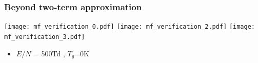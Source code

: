 \documentclass[mathserif, aspectratio=169]{beamer}
\begin{document}
\begin{frame}[fragile]
\begin{center}
	\end{center}
\end{frame}



\begin{frame}
	\frametitle{Beyond two-term approximation}
	\vspace{-0.25in}
	\begin{center}
		\texttt{[image: mf\_verification\_0.pdf]}
		\texttt{[image: mf\_verification\_2.pdf]}
		\texttt{[image: mf\_verification\_3.pdf]}
	\end{center}
	\begin{itemize}
		\item $E/N$ = 500Td , $T_g$=0K
	\end{itemize}
\end{frame}
\end{document}
